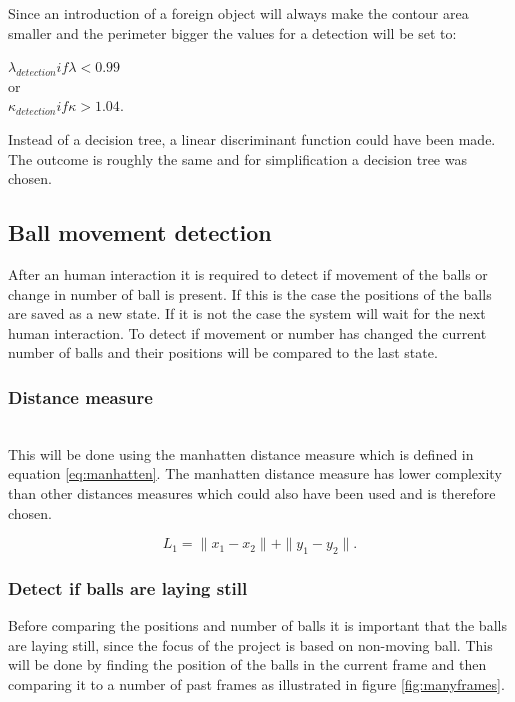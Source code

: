 Since an introduction of a foreign object will always make the contour area smaller and the perimeter bigger the values for a detection will be set to:

\begin{center}
$\lambda_{detection} if \lambda < 0.99$ \\
or\\
$\kappa_{detection} if \kappa > 1.04$.
\end{center}

Instead of a decision tree, a linear discriminant function could have been made. The outcome is roughly the same and for simplification a decision tree was chosen.

\subsection{Ball movement detection}
After an human interaction it is required to detect if movement of the balls or change in number of ball is present. If this is the case the 
positions of the balls are saved as a new state. If it is not the case the system will wait for the next human interaction. To detect if movement or number has changed the current number of balls and their positions will be compared to the last state.


\subsubsection{Distance measure}\\
This  will be done using the manhatten distance measure which is defined in equation \ref{eq:manhatten}. The manhatten distance measure has lower complexity than other distances measures which could also have been used and is therefore chosen. 

\begin{equation}
L_{1} = \parallel x_{1}-x_{2}\parallel + \parallel y_{1}-y_{2}\parallel.
\label{eq:manhatten}
\end{equation}

\subsubsection{Detect if balls are laying still}
Before comparing the positions and number of balls it is important that the balls are laying still, since the focus of the project is based on non-moving ball. This will be done by finding the position of the balls in the current frame and then comparing it to a number of past frames as illustrated in figure \ref{fig:manyframes}.

